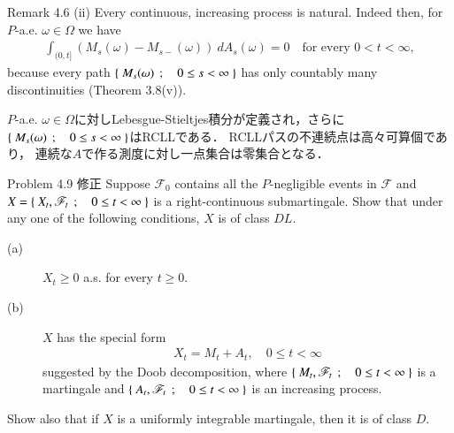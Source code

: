 	\begin{itembox}[l]{Remark 4.6 (ii)}
		Every continuous, increasing process is natural. Indeed then, for $P$-a.e. $\omega \in \Omega$
		we have
		\begin{align}
			\int_{(0,t]} (M_s(\omega)-M_{s-}(\omega))\ dA_s(\omega) = 0
			\quad \mbox{for every $0 < t < \infty$},
		\end{align}
		because every path $\left\{\ M_s(\omega)\ \, ; \quad 0 \leq s < \infty\ \right\}$ has only countably many discontinuities
		(Theorem 3.8(v)).
	\end{itembox}
	
	\begin{prf}
		$P$-a.e. $\omega \in \Omega$に対しLebesgue-Stieltjes積分が定義され，さらに
		$\left\{\ M_s(\omega)\ \, ; \quad 0 \leq s < \infty\ \right\}$はRCLLである．
		RCLLパスの不連続点は高々可算個であり，
		連続な$A$で作る測度に対し一点集合は零集合となる．
		\QED
	\end{prf}
	
	\begin{itembox}[l]{Problem 4.9 修正}
		Suppose $\mathscr{F}_0$ contains all the $P$-negligible events in $\mathscr{F}$ and
		$X = \left\{\ X_t,\mathscr{F}_t\ \, ; \quad 0 \leq t < \infty\ \right\}$ is a right-continuous submartingale.
		Show that under any one of the following conditions, $X$ is of class $DL$.
		\begin{description}
			\item[(a)] $X_t \geq 0$ a.s. for every $t \geq 0$.
			\item[(b)] $X$ has the special form
				\begin{align}
					X_t = M_t + A_t, \quad 0 \leq t < \infty
				\end{align}
				suggested by the Doob decomposition, where $\left\{\ M_t,\mathscr{F}_t\ \, ; \quad 0 \leq t < \infty\ \right\}$
				is a martingale and $\left\{\ A_t,\mathscr{F}_t\ \, ; \quad 0 \leq t < \infty\ \right\}$ is an increasing process.
		\end{description}
		Show also that if $X$ is a uniformly integrable martingale, then it is of class $D$.
	\end{itembox}
	
